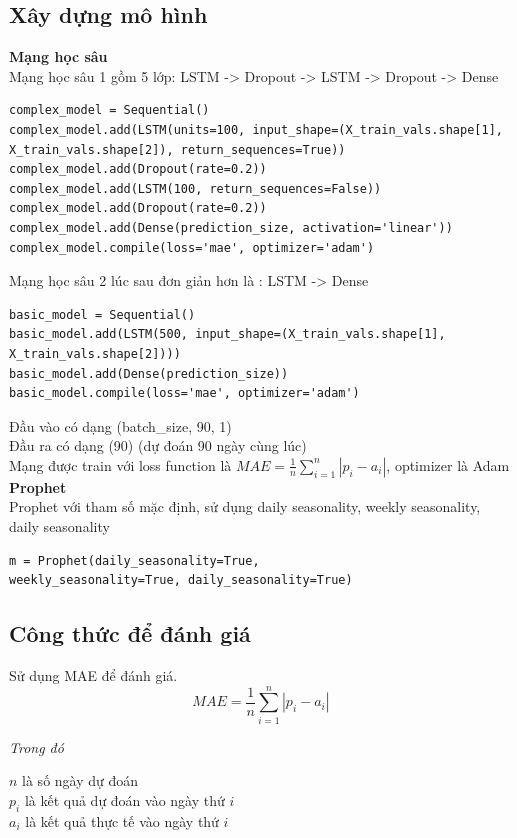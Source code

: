 \subsection{Xây dựng mô hình}
\textbf{Mạng học sâu} \\
Mạng học sâu 1 gồm 5 lớp: LSTM -> Dropout -> LSTM -> Dropout -> Dense \\
\begin{verbatim}
complex_model = Sequential()
complex_model.add(LSTM(units=100, input_shape=(X_train_vals.shape[1],
X_train_vals.shape[2]), return_sequences=True))
complex_model.add(Dropout(rate=0.2))
complex_model.add(LSTM(100, return_sequences=False))
complex_model.add(Dropout(rate=0.2))
complex_model.add(Dense(prediction_size, activation='linear'))
complex_model.compile(loss='mae', optimizer='adam')
\end{verbatim}
Mạng học sâu 2 lúc sau đơn giản hơn là : LSTM -> Dense \\
\begin{verbatim}
basic_model = Sequential()
basic_model.add(LSTM(500, input_shape=(X_train_vals.shape[1],
X_train_vals.shape[2])))
basic_model.add(Dense(prediction_size))
basic_model.compile(loss='mae', optimizer='adam')
\end{verbatim}
Đầu vào có dạng (batch\_size, 90, 1) \\
Đầu ra có dạng (90) (dự đoán 90 ngày cùng lúc) \\
Mạng được train với loss function là \(MAE = \frac{1}{n}\sum_{i=1}^{n}|p_i - a_i|\), optimizer là Adam \\
\textbf{Prophet} \\
Prophet với tham số mặc định, sử dụng daily seasonality, weekly seasonality, daily seasonality \\
\begin{verbatim}
m = Prophet(daily_seasonality=True,
weekly_seasonality=True, daily_seasonality=True)
\end{verbatim}
\subsection{Công thức để đánh giá}
Sử dụng MAE để đánh giá. \\
\[MAE = \frac{1}{n}\sum_{i=1}^{n}|p_i - a_i|\]
\begin{minipage}[t]{.27\textwidth}
	\textit{Trong đó}
\end{minipage}
\hspace*{15pt}
\begin{minipage}[t]{.65\textwidth}
	\(n\) là số ngày dự đoán \\
	\(p_i\) là kết quả dự đoán vào ngày thứ \(i\) \\
	\(a_i\) là kết quả thực tế vào ngày thứ \(i\) \\
\end{minipage} \\[5mm]


